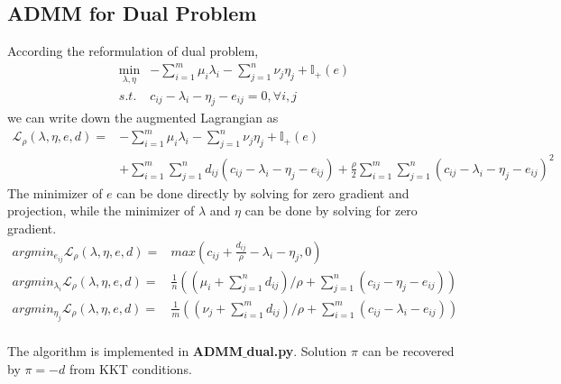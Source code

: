 \documentclass{article}
\begin{document}
\subsection{ADMM for Dual Problem}
According the reformulation of dual problem,
\begin{equation}
  \begin{aligned}
    \min_{\lambda,\eta} & -\sum_{i=1}^{m}\mu_{i}\lambda_{i}-\sum_{j=1}^{n}\nu_{j}\eta_{j}+\mathbb{I}_{+}(e)\\
    s.t. & c_{i j}-\lambda_{i}-\eta_{j}-e_{ij}=0, \forall i, j
    \end{aligned}
\end{equation} 
we can write down the augmented Lagrangian as
\begin{equation} \label{Eq:admm_dual}
  \begin{aligned}
\mathcal{L}_{\rho}(\lambda,\eta,e,d)=&-\sum_{i=1}^{m}\mu_{i}\lambda_{i}-\sum_{j=1}^{n}\nu_{j}\eta_{j}+\mathbb{I}_{+}(e)\\
&+\sum_{i=1}^{m}\sum_{j=1}^{n}d_{ij}(c_{i j}-\lambda_{i}-\eta_{j}-e_{ij})+\frac{\rho}{2}\sum_{i=1}^{m}\sum_{j=1}^{n}(c_{i j}-\lambda_{i}-\eta_{j}-e_{ij})^{2}
\end{aligned}
\end{equation}
The minimizer of $e$ can be done directly by solving for zero gradient and projection, while
the minimizer of $\lambda$ and $\eta$ can be done by solving for zero gradient.
\begin{equation}
  \begin{aligned}
    argmin_{e_{ij}}\mathcal{L}_{\rho}(\lambda,\eta,e,d)=& max\left(c_{ij}+\frac{d_{ij}}{\rho}-\lambda_{i}-\eta_{j}, 0\right)\\
    argmin_{\lambda_{i}}\mathcal{L}_{\rho}(\lambda,\eta,e,d)=& \frac{1}{n}\left((\mu_{i}+\sum_{j=1}^{n}d_{ij})/\rho+\sum_{j=1}^{n}(c_{ij}-\eta_{j}-e_{ij})\right)\\
    argmin_{\eta_{j}}\mathcal{L}_{\rho}(\lambda,\eta,e,d)=& \frac{1}{m}\left((\nu_{j}+\sum_{i=1}^{m}d_{ij})/\rho+\sum_{i=1}^{m}(c_{ij}-\lambda_{i}-e_{ij})\right)\\
  \end{aligned}
\end{equation}

The algorithm is implemented in \textbf{ADMM$\_$dual.py}.
Solution $\pi$ can be recovered by $\pi=-d$ from KKT conditions.
\end{document}
